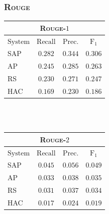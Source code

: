 \begin{frame}
    \frametitle{\textsc{Rouge}}
\begin{table}[h]
\centering
\begin{tabular}{l c c c}
    \multicolumn{4}{c}{\textsc{Rouge}-$1$}\\
\hline
\hline
$\mathrm{System}$ & $\mathrm{Recall}$ & $\mathrm{Prec.}$ & $\mathrm{F}_1$\\
[0.5ex]
\hline
SAP & $\mathbf{0.282}$ & $\mathbf{0.344}$ & $\mathbf{0.306}$\\
AP          & $0.245$ & $0.285$ & $0.263$ \\
RS          & $0.230$ & $0.271$ & $0.247$ \\
HAC         & $0.169$ & $0.230$ & $0.186$ \\
\hline %
\end{tabular}
~\\[1ex]
~\\
\begin{tabular}{l c c c}
    \multicolumn{4}{c}{\textsc{Rouge}-$2$}\\
\hline
\hline
$\mathrm{System}$ & $\mathrm{Recall}$ & $\mathrm{Prec.}$ & $\mathrm{F}_1$\\[0.5ex]
\hline
\textsc{SAP} & $\mathbf{0.045}$ & $\mathbf{0.056}$ & $\mathbf{0.049}$\\
\textsc{AP}          & $0.033$ & $0.038$ & $0.035$ \\
\textsc{RS}          & $0.031$ & $0.037$ & $0.034$ \\
\textsc{HAC}         & $0.017$ & $0.024$ & $0.019$ \\
\hline %
\end{tabular}
\end{table}
\end{frame}


